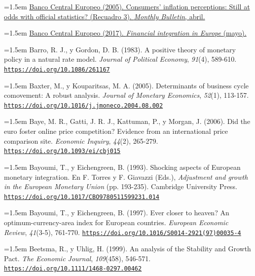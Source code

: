 \documentclass[10pt,a4paper]{article}
\begin{document}
\noindent\hangindent=1.5em \href{https://www.ecb.europa.eu/pub/pdf/other/mb200504_focus03.en.pdf}{Banco Central Europeo (2005). Consumers' inflation perceptions: Still at odds with official statistics? (Recuadro 3). \textit{Monthly Bulletin}, abril.}

\noindent\hangindent=1.5em \href{https://www.ecb.europa.eu/pub/pdf/fie/ecb.financialintegrationineurope201705.en.pdf}{Banco Central Europeo (2017). \textit{Financial integration in Europe} (mayo).}

\noindent\hangindent=1.5em Barro, R. J., y Gordon, D. B. (1983). A positive theory of monetary policy in a natural rate model. \textit{Journal of Political Economy}, \textit{91}(4), 589-610. \href{https://doi.org/10.1086/261167}{\nolinkurl{https://doi.org/10.1086/261167}}

\noindent\hangindent=1.5em Baxter, M., y Kouparitsas, M. A. (2005). Determinants of business cycle comovement: A robust analysis. \textit{Journal of Monetary Economics}, \textit{52}(1), 113-157. \href{https://doi.org/10.1016/j.jmoneco.2004.08.002}{\nolinkurl{https://doi.org/10.1016/j.jmoneco.2004.08.002}}

\noindent\hangindent=1.5em Baye, M. R., Gatti, J. R. J., Kattuman, P., y Morgan, J. (2006). Did the euro foster online price competition? Evidence from an international price comparison site. \textit{Economic Inquiry}, \textit{44}(2), 265-279. \href{https://doi.org/10.1093/ei/cbj015}{\nolinkurl{https://doi.org/10.1093/ei/cbj015}}

\noindent\hangindent=1.5em Bayoumi, T., y Eichengreen, B. (1993). Shocking aspects of European monetary integration. En F. Torres y F. Giavazzi (Eds.), \textit{Adjustment and growth in the European Monetary Union} (pp. 193-235). Cambridge University Press. \href{https://doi.org/10.1017/CBO9780511599231.014}{\nolinkurl{https://doi.org/10.1017/CBO9780511599231.014}}

\noindent\hangindent=1.5em Bayoumi, T., y Eichengreen, B. (1997). Ever closer to heaven? An optimum-currency-area index for European countries. \textit{European Economic Review}, \textit{41}(3-5), 761-770. \href{https://doi.org/10.1016/S0014-2921(97)00035-4}{\nolinkurl{https://doi.org/10.1016/S0014-2921(97)00035-4}}

\noindent\hangindent=1.5em Beetsma, R., y Uhlig, H. (1999). An analysis of the Stability and Growth Pact. \textit{The Economic Journal}, \textit{109}(458), 546-571. \href{https://doi.org/10.1111/1468-0297.00462}{\nolinkurl{https://doi.org/10.1111/1468-0297.00462}}
\end{document}
